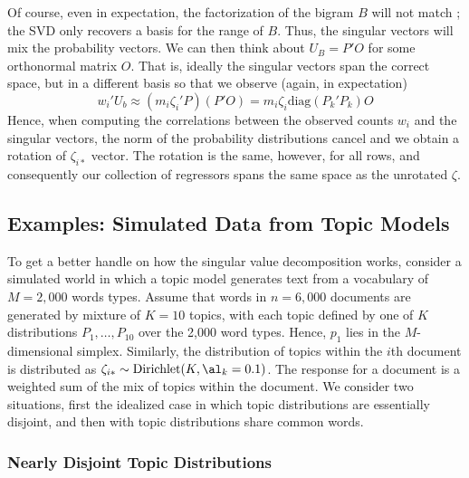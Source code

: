 \documentclass[12pt]{article}
\begin{document}
 
 Of course, even in expectation, the factorization of the bigram $B$ will not
 match  ; the SVD  only recovers a basis for the range of $B$.  Thus, the 
 singular vectors will mix the probability vectors.  We can
 then think about $U_B = P'O$ for some orthonormal matrix $O$.  That is, ideally
 the singular vectors span the correct space, but in a different basis so that
 we observe (again, in expectation)
 \begin{displaymath}
   w_i'U_b \approx (m_i \zeta_i'P)(P'O) = m_i \zeta_i \mbox{diag}(P_k'P_k) O
 \end{displaymath}
 Hence, when computing the correlations between the observed counts $w_i$ and the
 singular vectors, the norm of the probability distributions cancel and we
 obtain a rotation of  $\zeta_{i*}$ vector.  The rotation is the same, however,
 for all rows, and consequently our collection of regressors spans the same
 space as the unrotated $\zeta$.



\subsection{Examples: Simulated Data from Topic Models}

 To get a better handle on how the singular value decomposition works, consider
 a simulated world in which a topic model generates text from a vocabulary of $M
 = 2,000$ words types.  Assume that words in $n = 6,000$ documents are generated by mixture of $K=10$ topics, with each topic defined by  one of $K$ distributions $P_1,\ldots, P_{10}$ over the 2,000 word types.  
 Hence, $p_1$ lies in the $M$-dimensional
 simplex.     Similarly, the distribution of topics within the $i$th document is distributed as $\zeta_{i*} \sim \mbox{Dirichlet}(K, \al_k=0.1)$.  The response for a document is a weighted sum of the mix of topics within the document.  We consider two situations, first the idealized case in which topic distributions are essentially disjoint, and then with topic distributions share common words.
 
 \subsubsection{Nearly Disjoint Topic Distributions} %
 
\end{document}
